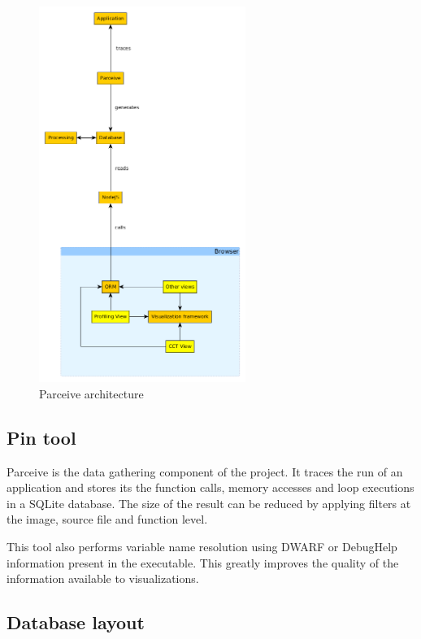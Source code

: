 \begin{figure}
	\centering
	\includegraphics[width=0.6\textwidth]{parceive}
	
	\caption{Parceive architecture}
	\label{parceive:architecture}
\end{figure}

\subsection{Pin tool}

Parceive is the data gathering component of the project. It traces the run of an application and stores its the function calls, memory accesses and loop executions in a SQLite database. The size of the result can be reduced by applying filters at the image, source file and function level.

This tool also performs variable name resolution using DWARF or DebugHelp information present in the executable. This greatly improves the quality of the information available to visualizations.

\subsection{Database layout}

